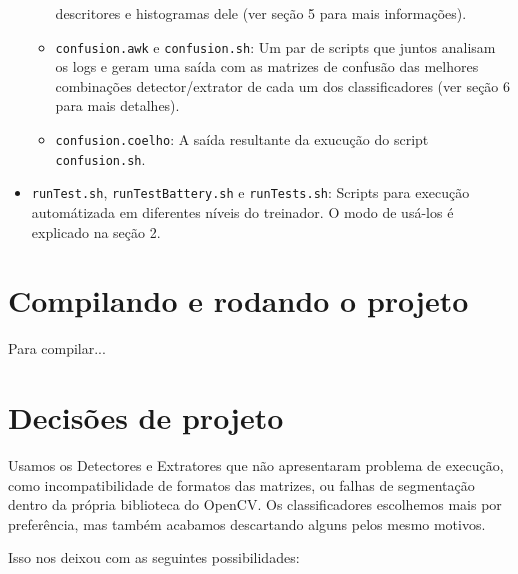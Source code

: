 \documentclass[a4paper,11pt]{article}
\begin{document}
\begin{itemize}
\begin{itemize}
          descritores e histogramas dele (ver seção 5 para mais informações).
        \item \verb$confusion.awk$ e \verb$confusion.sh$:
          Um par de scripts que juntos analisam os logs e geram uma saída com as
          matrizes de confusão das melhores combinações detector/extrator de
          cada um dos classificadores (ver seção 6 para mais detalhes).
        \item \verb$confusion.coelho$:
          A saída resultante da exucução do script \verb$confusion.sh$.
      \end{itemize}
    \item \verb$runTest.sh$, \verb$runTestBattery.sh$ e \verb$runTests.sh$:
      Scripts para execução automátizada em diferentes níveis do treinador. O
      modo de usá-los é explicado na seção 2.
  \end{itemize}

\section{Compilando e rodando o projeto}

  Para compilar...

\section{Decisões de projeto}

  Usamos os Detectores e Extratores que não apresentaram problema de execução,
  como incompatibilidade de formatos das matrizes, ou falhas de segmentação
  dentro da própria biblioteca do OpenCV. Os classificadores escolhemos mais
  por preferência, mas também acabamos descartando alguns pelos mesmo motivos.  

  Isso nos deixou com as seguintes possibilidades:
\end{document}
